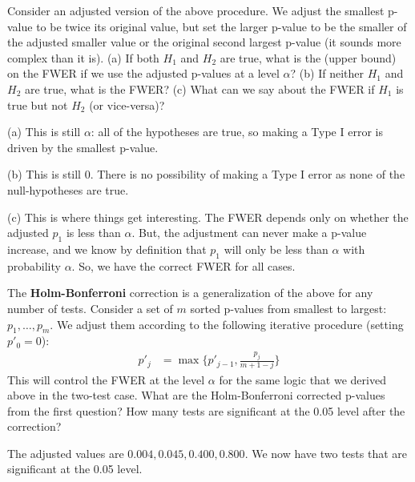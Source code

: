 
Consider an adjusted version of the above procedure. We adjust the smallest 
p-value to be twice its original value, but set the larger p-value to be
the smaller of the adjusted smaller value or the original second largest
p-value (it sounds more complex than it is). (a) If both $H_1$ and $H_2$
are true, what is the (upper bound) on the FWER if we use the adjusted
p-values at a level $\alpha$? (b) If neither $H_1$ and $H_2$ are true,
what is the FWER? (c) What can we say about the FWER if $H_1$ is true
but not $H_2$ (or vice-versa)?


(a) This is still $\alpha$: all of the hypotheses are true, so making a
Type I error is driven by the smallest p-value.

(b) This is still $0$. There is no possibility of making a Type I error
as none of the null-hypotheses are true.

(c) This is where things get interesting. The FWER depends only on whether
the adjusted $p_1$ is less than $\alpha$. But, the adjustment can never 
make a p-value increase, and we know by definition that $p_1$ will only
be less than $\alpha$ with probability $\alpha$. So, we have the correct
FWER for all cases.



The \textbf{Holm-Bonferroni} correction is a generalization of the above
for any number of tests. Consider a set of $m$ sorted p-values from smallest
to largest: $p_1, \ldots, p_m$. We adjust them according to the following
iterative procedure (setting $p'_0 = 0$):
\begin{align*}
p'_j &= \max\{ p'_{j-1}, \frac{p_j}{m + 1 - j} \}
\end{align*}
This will control the FWER at the level $\alpha$ for the same logic that we
derived above in the two-test case. What are the Holm-Bonferroni corrected
p-values from the first question? How many tests are significant at the 0.05
level after the correction?


The adjusted values are $0.004, 0.045, 0.400, 0.800$. We now have two tests
that are significant at the 0.05 level.
